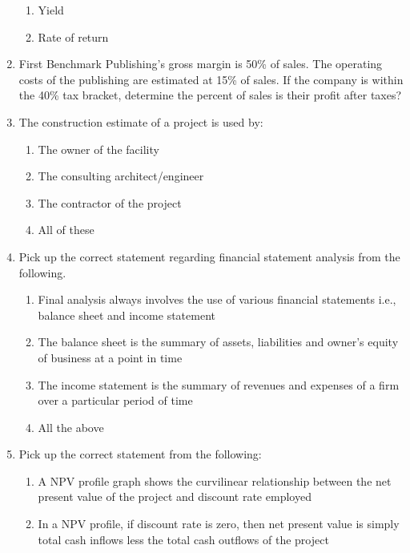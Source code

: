 \documentclass[11pt,a4paper]{article}
\begin{document}
\begin{enumerate}
\begin{enumerate}[label=\Alph*.]
\item{Yield}
\item{Rate of return}
\end{enumerate}
\item{First Benchmark Publishing's gross margin is 50\% of sales. The operating costs of the publishing are estimated at 15\% of sales. If the company is within the 40\% tax bracket, determine the percent of sales is their profit after taxes?
}
\\
\item{The construction estimate of a project is used by:}
\begin{enumerate}[label=\Alph*.]
\item{The owner of the facility}
\item{The consulting architect/engineer}
\item{The contractor of the project}
\item{All of these}
\end{enumerate}
\item{Pick up the correct statement regarding financial statement analysis from the following.}
\begin{enumerate}[label=\Alph*.]
\item{Final analysis always involves the use of various financial statements i.e., balance sheet and income statement}
\item{The balance sheet is the summary of assets, liabilities and owner's equity of business at a point in time}
\item{The income statement is the summary of revenues and expenses of a firm over a particular period of time}
\item{All the above}
\end{enumerate}
\item{Pick up the correct statement from the following:}
\begin{enumerate}[label=\Alph*.]
\item{A NPV profile graph shows the curvilinear relationship between the net present value of the project and discount rate employed}
\item{In a NPV profile, if discount rate is zero, then net present value is simply total cash inflows less the total cash outflows of the project}

\end{enumerate}
\end{enumerate}
\end{document}
